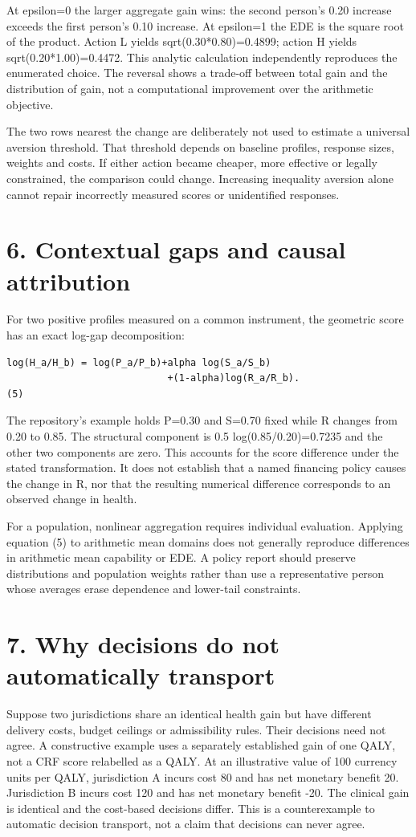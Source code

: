 \documentclass[11pt,a4paper]{article}
\begin{document}
At epsilon=0 the larger aggregate gain wins: the second person's 0.20 increase exceeds the first person's 0.10 increase. At epsilon=1 the EDE is the square root of the product. Action L yields sqrt(0.30*0.80)=0.4899; action H yields sqrt(0.20*1.00)=0.4472. This analytic calculation independently reproduces the enumerated choice. The reversal shows a trade-off between total gain and the distribution of gain, not a computational improvement over the arithmetic objective.

The two rows nearest the change are deliberately not used to estimate a universal aversion threshold. That threshold depends on baseline profiles, response sizes, weights and costs. If either action became cheaper, more effective or legally constrained, the comparison could change. Increasing inequality aversion alone cannot repair incorrectly measured scores or unidentified responses.

\section*{6. Contextual gaps and causal attribution}
For two positive profiles measured on a common instrument, the geometric score has an exact log-gap decomposition:

{\footnotesize\begin{verbatim}
log(H_a/H_b) = log(P_a/P_b)+alpha log(S_a/S_b)
                            +(1-alpha)log(R_a/R_b).                  (5)
\end{verbatim}}
The repository's example holds P=0.30 and S=0.70 fixed while R changes from 0.20 to 0.85. The structural component is 0.5 log(0.85/0.20)=0.7235 and the other two components are zero. This accounts for the score difference under the stated transformation. It does not establish that a named financing policy causes the change in R, nor that the resulting numerical difference corresponds to an observed change in health.

For a population, nonlinear aggregation requires individual evaluation. Applying equation (5) to arithmetic mean domains does not generally reproduce differences in arithmetic mean capability or EDE. A policy report should preserve distributions and population weights rather than use a representative person whose averages erase dependence and lower-tail constraints.

\section*{7. Why decisions do not automatically transport}
Suppose two jurisdictions share an identical health gain but have different delivery costs, budget ceilings or admissibility rules. Their decisions need not agree. A constructive example uses a separately established gain of one QALY, not a CRF score relabelled as a QALY. At an illustrative value of 100 currency units per QALY, jurisdiction A incurs cost 80 and has net monetary benefit 20. Jurisdiction B incurs cost 120 and has net monetary benefit -20. The clinical gain is identical and the cost-based decisions differ. This is a counterexample to automatic decision transport, not a claim that decisions can never agree.
\end{document}
